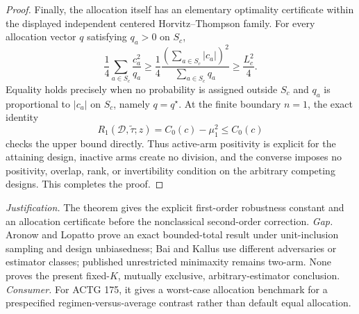\documentclass{article}
\begin{document}
\begin{proof}
Finally, the allocation itself has an elementary optimality certificate
within the displayed independent centered Horvitz--Thompson family.  For
every allocation vector \(q\) satisfying \(q_a>0\) on \(S_c\),
\[
 \frac14\sum_{a\in S_c}\frac{c_a^2}{q_a}
 \ge
 \frac14\frac{(\sum_{a\in S_c}|c_a|)^2}
 {\sum_{a\in S_c}q_a}
 \ge\frac{L_c^2}{4}.
\]
Equality holds precisely when no probability is assigned outside \(S_c\)
and \(q_a\) is proportional to \(|c_a|\) on \(S_c\), namely
\(q=q^\star\).  At the finite boundary \(n=1\), the exact identity
\[
 R_1(\mathcal D,\widetilde\tau;z)=C_0(c)-\mu_1^2\le C_0(c)
\]
checks the upper bound directly.  Thus active-arm positivity is explicit
for the attaining design, inactive arms create no division, and the
converse imposes no positivity, overlap, rank, or invertibility condition
on the arbitrary competing designs.  This completes the proof.
\end{proof}
\par\smallskip\noindent \textit{Justification.} The theorem gives the explicit first-order robustness constant and an allocation certificate before the nonclassical second-order correction. \textit{Gap.} Aronow and Lopatto prove an exact bounded-total result under unit-inclusion sampling and design unbiasedness; Bai and Kallus use different adversaries or estimator classes; published unrestricted minimaxity remains two-arm.  None proves the present fixed-\(K\), mutually exclusive, arbitrary-estimator conclusion. \textit{Consumer.} For ACTG 175, it gives a worst-case allocation benchmark for a prespecified regimen-versus-average contrast rather than default equal allocation.
\end{document}
